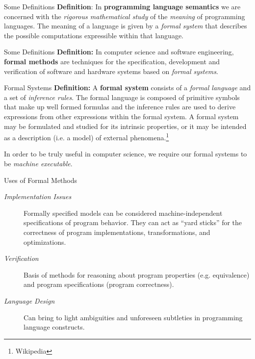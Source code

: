 \documentclass{beamer}
\begin{document}
\begin{frame}{Some Definitions}
\vspace{.1in}
{\bf Definition}: In {\bf programming language semantics} we are concerned with the {\em rigorous mathematical study} of the {\em meaning} of programming languages. The meaning of a language is given by a {\em formal system} that describes the possible computations expressible within that language.
\end{frame}

\begin{frame}{Some Definitions}
\vspace{.1in}
{\bf Definition:} In computer science and software engineering, {\bf formal methods} are  techniques for the specification, development and verification of software and hardware systems based on {\em formal systems}.

\end{frame}


\begin{frame}{Formal Systems}
\vspace{.1in}
{\bf Definition:} 
A {\bf formal system} consists of a {\em formal language} and a set of  {\em inference rules}.
The formal language is composed of
primitive symbols that make up well formed formulas and the inference rules are used to derive expressions from other expressions within the formal system. A formal system may be formulated and studied for its intrinsic properties, or it may be intended as a description (i.e. a model) of external phenomena.\footnote{Wikipedia}

\vspace{.1in}
In order to be truly useful in computer science, we require our formal systems to be {\em machine executable}.

\end{frame}

\begin{frame}{Uses of Formal Methods}

\begin{description}
\item[\em Implementation Issues] Formally specified models can be considered machine-independent specifications of 
program behavior. They can act as ``yard sticks'' for the correctness of program implementations, transformations, and 
optimizations. 
\item[\em Verification] Basis of methods for reasoning about program 
properties (e.g. equivalence) and program specifications (program correctness). 
\item[\em Language Design] Can bring to light ambiguities and unforeseen 
subtleties in programming language constructs.
\end{description}
\end{frame}
\end{document}
